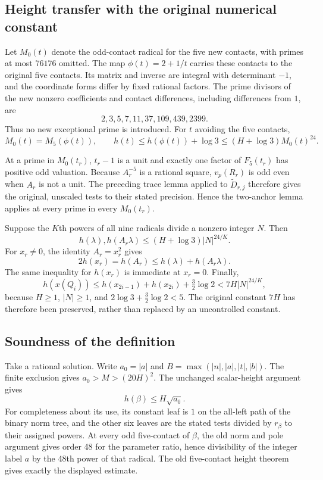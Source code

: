 \subsection{Height transfer with the original numerical constant}
Let $M_0(t)$ denote the odd-contact radical for the five new contacts,
with primes at most $76176$ omitted. The map $\phi(t)=2+1/t$ carries
these contacts to the original five contacts. Its matrix and inverse
are integral with determinant $-1$, and the coordinate forms differ
by fixed rational factors. The prime divisors of the new nonzero
coefficients and contact differences, including differences from $1$,
are
\[
 2,3,5,7,11,37,109,439,2399.
\]
Thus no new exceptional prime is introduced. For $t$ avoiding the
five contacts,
\[
 M_0(t)=M_5(\phi(t)),\qquad
 h(t)\le h(\phi(t))+\log3
       \le(H+\log3)M_0(t)^{24}.
\]

At a prime in $M_0(t_r)$, $t_r-1$ is a unit and exactly one factor
of $F_5(t_r)$ has positive odd valuation. Because $A_r^{-5}$ is a
rational square, $v_p(R_r)$ is odd even when $A_r$ is not a unit.
The preceding trace lemma applied to $\widetilde D_{r,j}$ therefore
gives the original, unscaled tests to their stated precision. Hence
the two-anchor lemma applies at every prime in every $M_0(t_r)$.

Suppose the $K$th powers of all nine radicals divide a nonzero integer
$N$. Then
\[
 h(\lambda),h(A_r\lambda)
 \le(H+\log3)|N|^{24/K}.
\]
For $x_r\ne0$, the identity $A_r=x_r^2$ gives
\[
 2h(x_r)=h(A_r)\le h(\lambda)+h(A_r\lambda).
\]
The same inequality for $h(x_r)$ is immediate at $x_r=0$. Finally,
\[
 h(x(Q_i))\le h(x_{2i-1})+h(x_{2i})+\tfrac32\log2
 <7H|N|^{24/K},
\]
because $H\ge1$, $|N|\ge1$, and $2\log3+\tfrac32\log2<5$.
The original constant $7H$ has therefore been preserved, rather than
replaced by an uncontrolled constant.

\subsection{Soundness of the definition}
Take a rational solution. Write $a_0=|a|$ and
$B=\max(|n|,|a|,|t|,|b|)$. The finite exclusion gives
$a_0>M>(20H)^2$. The unchanged scalar-height argument gives
\[
 h(\beta)\le H\sqrt{a_0}.
\]
For completeness about its use, its constant leaf is $1$ on the
all-left path of the binary norm tree, and the other six leaves are
the stated tests divided by $r_\beta$ to their assigned powers.
At every odd five-contact of $\beta$, the old norm and pole argument
gives order 48 for the parameter ratio, hence divisibility of the
integer label $a$ by the 48th power of that radical. The old
five-contact height theorem gives exactly the displayed estimate.

